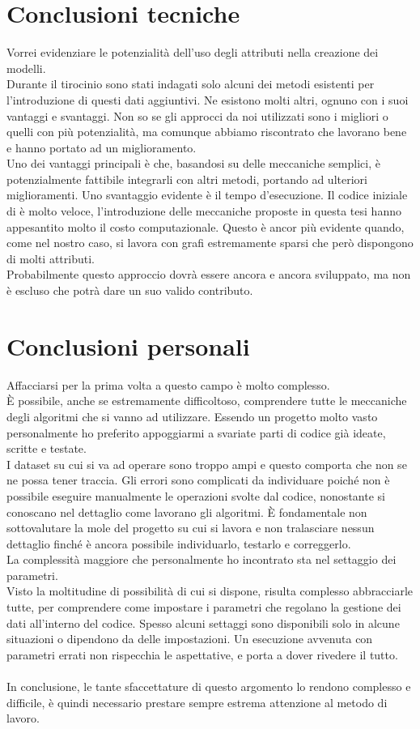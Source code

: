 \section*{Conclusioni tecniche}
Vorrei evidenziare le potenzialità dell'uso degli attributi nella creazione dei modelli.\\
Durante il tirocinio sono stati indagati solo alcuni dei metodi esistenti per l'introduzione di questi dati aggiuntivi. Ne esistono molti altri, ognuno con i suoi vantaggi e svantaggi. Non so se gli approcci da noi utilizzati sono i migliori o quelli con più potenzialità, ma comunque abbiamo riscontrato che lavorano bene e hanno portato ad un miglioramento.\\
Uno dei vantaggi principali è che, basandosi su delle meccaniche semplici, è potenzialmente fattibile integrarli con altri metodi, portando ad ulteriori miglioramenti. Uno svantaggio evidente è il tempo d'esecuzione. Il codice iniziale di \cnrl è molto veloce, l'introduzione delle meccaniche proposte in questa tesi hanno appesantito molto il costo computazionale. Questo è ancor più evidente quando, come nel nostro caso, si lavora con grafi estremamente sparsi che però dispongono di molti attributi.\\
Probabilmente questo approccio dovrà essere ancora e ancora sviluppato, ma non è escluso che potrà dare un suo valido contributo.
%
\section*{Conclusioni personali}
Affacciarsi per la prima volta a questo campo è molto complesso.\\
È possibile, anche se estremamente difficoltoso, comprendere tutte le meccaniche degli algoritmi che si vanno ad utilizzare. Essendo un progetto molto vasto personalmente ho preferito appoggiarmi a svariate parti di codice già ideate, scritte e testate.\\
I dataset su cui si va ad operare sono troppo ampi e questo comporta che non se ne possa tener traccia. Gli errori sono complicati da individuare poiché non è possibile eseguire manualmente le operazioni svolte dal codice, nonostante si conoscano nel dettaglio come lavorano gli algoritmi. È fondamentale non sottovalutare la mole del progetto su cui si lavora e non tralasciare nessun dettaglio finché è ancora possibile individuarlo, testarlo e correggerlo.\\
La complessità maggiore che personalmente ho incontrato sta nel settaggio dei parametri.\\
Visto la moltitudine di possibilità di cui si dispone, risulta complesso abbracciarle tutte, per comprendere come impostare i parametri che regolano la gestione dei dati all'interno del codice. Spesso alcuni settaggi sono disponibili solo in alcune situazioni o dipendono da delle impostazioni. Un esecuzione avvenuta con parametri errati non rispecchia le aspettative, e porta a dover rivedere il tutto.\\
\\
In conclusione, le tante sfaccettature di questo argomento lo rendono complesso e difficile, è quindi necessario prestare sempre estrema attenzione al metodo di lavoro.

%




